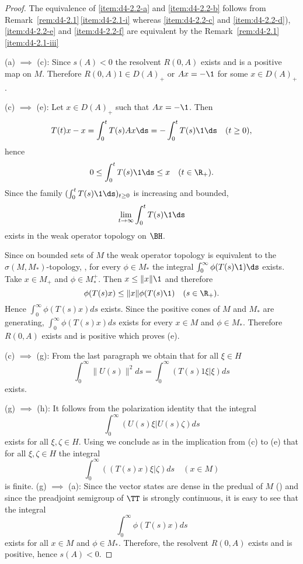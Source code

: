 \begin{proof}
The equivalence of \ref{item:d4-2.2-a} and \ref{item:d4-2.2-b} follows from Remark~\ref{rem:d4-2.1}\,\ref{item:d4-2.1-i} whereas \ref{item:d4-2.2-c} and \ref{item:d4-2.2-d}), \resp  \ref{item:d4-2.2-e} and \ref{item:d4-2.2-f} are equivalent by the Remark~\ref{rem:d4-2.1}\,\ref{item:d4-2.1-iii}

(a) $\implies$ (c): Since $s(A) < 0$ the resolvent $R(0,A)$ exists and is a positive map on $M$.
Therefore $R(0,A)1 \in D(A)_{+}$ or $Ax = -\1$ for some $x \in D(A)_{+}$.

(c) $\implies$ (e): Let $x \in D(A)_{+}$ such that $Ax = -\1$.
Then
\[
T(t)x - x = \int_{0}^{t} T(s)Ax \ds = -\int_{0}^{t} T(s) \1 \ds \quad (t \geq 0),
\]
hence
\[
0 \leq \int_{0}^{t} T(s) \1 \ds \leq x \quad (t \in \R_{+}).
\]
Since the family $(\int_{0}^{t} T(s)\1 \ds)_{t \geq 0}$ is increasing and bounded, 
%
\[
	\lim_{t \to \infty} \int_{0}^{t} T(s) \1 \ds
\]
%
exists in the weak operator topology on $\BH$.

Since on bounded sets of $M$ the weak operator topology is equivalent to the $\sigma(M,M_{*})$-topology, \citet[1.15.2.]{sakai:1971}, for every $\phi \in M_{*}$ the integral $ \int_{0}^{\infty}\phi(T(s) \1) \ds $ exists.
Take $x \in M_{+}$ and $\phi \in M_{*}^{+}$.
Then $x \leq \|x\| \1$ and therefore
\[
	\phi(T(s)x) \leq \|x\|\phi(T(s) \1) \quad (s \in \R_{+}).
\]
Hence $\int_{0}^{\infty} \phi(T(s)x)ds$ exists.
Since the positive cones of $M$ and $M_{*}$ are generating, $\int_{0}^{\infty}\phi(T(s)x)ds$ exists for every $x \in M$ and $\phi \in M_{*}$.
Therefore $R(0,A)$ exists and is positive which proves (e).

(c) $\implies$ (g): From the last paragraph we obtain that for all $\xi \in H$
\[
\int_{0}^{\infty}\|U(s)\|^2ds = \int_{0}^{\infty}(T(s)1\xi|\xi)ds
\]
exists.

(g) $\implies$ (h): It follows from the polarization identity that the integral
\[
\int_{0}^{\infty}(U(s)\xi|U(s)\zeta)ds
\]
exists for all $\xi,\zeta \in H$.
Using \citet[Theorem III.4.2 and Theorem II.2.6]{takesaki:1979} we conclude as in the implication from (c) to (e) that for all $\xi,\zeta \in H$ the integral
\[
\int_{0}^{\infty}((T(s)x)\xi|\zeta)ds \quad (x \in M)
\]
is finite.
(g) $\implies$ (a): Since the vector states are dense in the predual of $M$ (\citet[Theorem II.2.6]{takesaki:1979}) and since the preadjoint semigroup of\/ $\TT$ is strongly continuous, it is easy to see that the integral
\[
\int_{0}^{\infty} \phi(T(s)x)ds
\]
exists for all $x \in M$ and $\phi \in M_{*}$.
Therefore, the resolvent $R(0,A)$ exists and is positive, hence $s(A) < 0$.
\end{proof}

